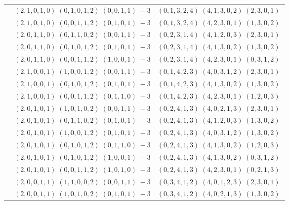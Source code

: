 \documentclass[11pt]{article}
\begin{document}
\begin{longtable}[l]{|c|c|c|}
 \cline{2-3} 
 & $(2 ,1 ,0 ,1 ,0) \;(0 ,1 ,0 ,1 ,2) \;(0 ,0 ,1 ,1) \;-3$ & $(0 ,1 ,3 ,2 ,4) \;(4 ,1 ,3 ,0 ,2) \;(2 ,3 ,0 ,1) \;$\\ 
 \cline{2-3} 
 & $(2 ,1 ,0 ,1 ,0) \;(0 ,0 ,1 ,1 ,2) \;(0 ,1 ,0 ,1) \;-3$ & $(0 ,1 ,3 ,2 ,4) \;(4 ,2 ,3 ,0 ,1) \;(1 ,3 ,0 ,2) \;$\\ 
 \cline{2-3} 
 & $(2 ,0 ,1 ,1 ,0) \;(0 ,1 ,1 ,0 ,2) \;(0 ,0 ,1 ,1) \;-3$ & $(0 ,2 ,3 ,1 ,4) \;(4 ,1 ,2 ,0 ,3) \;(2 ,3 ,0 ,1) \;$\\ 
 \cline{2-3} 
 & $(2 ,0 ,1 ,1 ,0) \;(0 ,1 ,0 ,1 ,2) \;(0 ,1 ,0 ,1) \;-3$ & $(0 ,2 ,3 ,1 ,4) \;(4 ,1 ,3 ,0 ,2) \;(1 ,3 ,0 ,2) \;$\\ 
 \cline{2-3} 
 & $(2 ,0 ,1 ,1 ,0) \;(0 ,0 ,1 ,1 ,2) \;(1 ,0 ,0 ,1) \;-3$ & $(0 ,2 ,3 ,1 ,4) \;(4 ,2 ,3 ,0 ,1) \;(0 ,3 ,1 ,2) \;$\\ 
 \cline{2-3} 
 & $(2 ,1 ,0 ,0 ,1) \;(1 ,0 ,0 ,1 ,2) \;(0 ,0 ,1 ,1) \;-3$ & $(0 ,1 ,4 ,2 ,3) \;(4 ,0 ,3 ,1 ,2) \;(2 ,3 ,0 ,1) \;$\\ 
 \cline{2-3} 
 & $(2 ,1 ,0 ,0 ,1) \;(0 ,1 ,0 ,1 ,2) \;(0 ,1 ,0 ,1) \;-3$ & $(0 ,1 ,4 ,2 ,3) \;(4 ,1 ,3 ,0 ,2) \;(1 ,3 ,0 ,2) \;$\\ 
 \cline{2-3} 
 & $(2 ,1 ,0 ,0 ,1) \;(0 ,0 ,1 ,1 ,2) \;(0 ,1 ,1 ,0) \;-3$ & $(0 ,1 ,4 ,2 ,3) \;(4 ,2 ,3 ,0 ,1) \;(1 ,2 ,0 ,3) \;$\\ 
 \cline{2-3} 
 & $(2 ,0 ,1 ,0 ,1) \;(1 ,0 ,1 ,0 ,2) \;(0 ,0 ,1 ,1) \;-3$ & $(0 ,2 ,4 ,1 ,3) \;(4 ,0 ,2 ,1 ,3) \;(2 ,3 ,0 ,1) \;$\\ 
 \cline{2-3} 
 & $(2 ,0 ,1 ,0 ,1) \;(0 ,1 ,1 ,0 ,2) \;(0 ,1 ,0 ,1) \;-3$ & $(0 ,2 ,4 ,1 ,3) \;(4 ,1 ,2 ,0 ,3) \;(1 ,3 ,0 ,2) \;$\\ 
 \cline{2-3} 
 & $(2 ,0 ,1 ,0 ,1) \;(1 ,0 ,0 ,1 ,2) \;(0 ,1 ,0 ,1) \;-3$ & $(0 ,2 ,4 ,1 ,3) \;(4 ,0 ,3 ,1 ,2) \;(1 ,3 ,0 ,2) \;$\\ 
 \cline{2-3} 
 & $(2 ,0 ,1 ,0 ,1) \;(0 ,1 ,0 ,1 ,2) \;(0 ,1 ,1 ,0) \;-3$ & $(0 ,2 ,4 ,1 ,3) \;(4 ,1 ,3 ,0 ,2) \;(1 ,2 ,0 ,3) \;$\\ 
 \cline{2-3} 
 & $(2 ,0 ,1 ,0 ,1) \;(0 ,1 ,0 ,1 ,2) \;(1 ,0 ,0 ,1) \;-3$ & $(0 ,2 ,4 ,1 ,3) \;(4 ,1 ,3 ,0 ,2) \;(0 ,3 ,1 ,2) \;$\\ 
 \cline{2-3} 
 & $(2 ,0 ,1 ,0 ,1) \;(0 ,0 ,1 ,1 ,2) \;(1 ,0 ,1 ,0) \;-3$ & $(0 ,2 ,4 ,1 ,3) \;(4 ,2 ,3 ,0 ,1) \;(0 ,2 ,1 ,3) \;$\\ 
 \cline{2-3} 
 & $(2 ,0 ,0 ,1 ,1) \;(1 ,1 ,0 ,0 ,2) \;(0 ,0 ,1 ,1) \;-3$ & $(0 ,3 ,4 ,1 ,2) \;(4 ,0 ,1 ,2 ,3) \;(2 ,3 ,0 ,1) \;$\\ 
 \cline{2-3} 
 & $(2 ,0 ,0 ,1 ,1) \;(1 ,0 ,1 ,0 ,2) \;(0 ,1 ,0 ,1) \;-3$ & $(0 ,3 ,4 ,1 ,2) \;(4 ,0 ,2 ,1 ,3) \;(1 ,3 ,0 ,2) \;$\\ 

\end{longtable}
\end{document}
